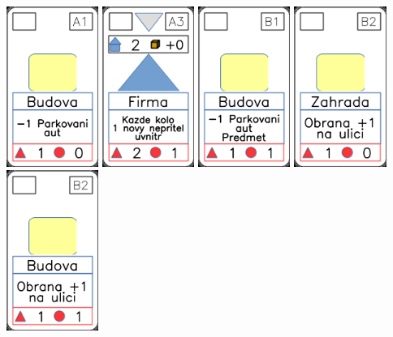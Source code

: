 \documentclass[a4paper]{article}
\begin{document}
	\includegraphics[width=3.0cm]{img-2_0}
	\includegraphics[width=3.0cm]{img-3_17}
	\includegraphics[width=3.0cm]{img-2_5}
	\includegraphics[width=3.0cm]{img-2_21}
	\includegraphics[width=3.0cm]{img-2_6}
\end{document}
